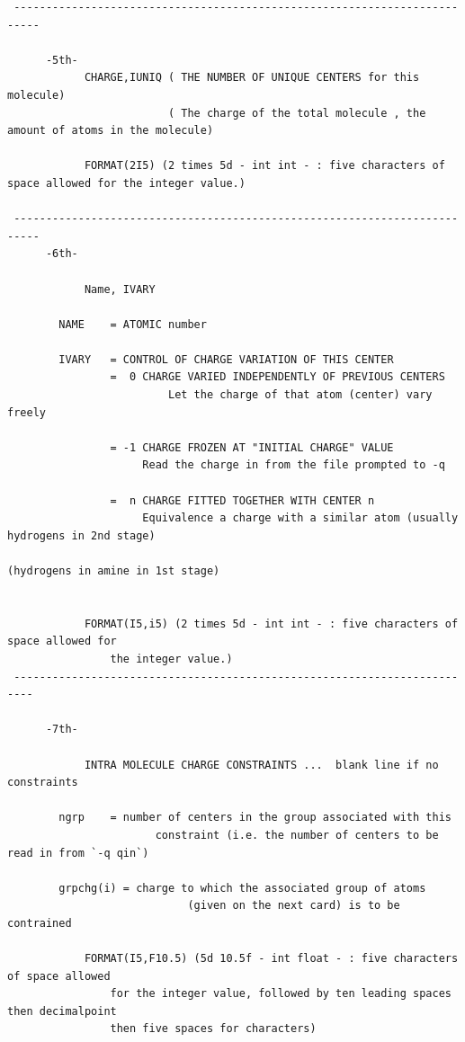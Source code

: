 \documentclass[a4paper]{article}
\begin{document}
\begin{tcolorbox}
\begin{verbatim}
 --------------------------------------------------------------------------
 
      -5th- 
            CHARGE,IUNIQ ( THE NUMBER OF UNIQUE CENTERS for this molecule)
                         ( The charge of the total molecule , the amount of atoms in the molecule)
 
            FORMAT(2I5) (2 times 5d - int int - : five characters of space allowed for the integer value.)
 
 --------------------------------------------------------------------------
      -6th-  
 
            Name, IVARY
 
        NAME    = ATOMIC number  
 
        IVARY   = CONTROL OF CHARGE VARIATION OF THIS CENTER
                =  0 CHARGE VARIED INDEPENDENTLY OF PREVIOUS CENTERS
                         Let the charge of that atom (center) vary freely
 
                = -1 CHARGE FROZEN AT "INITIAL CHARGE" VALUE
                     Read the charge in from the file prompted to -q
 
                =  n CHARGE FITTED TOGETHER WITH CENTER n
                     Equivalence a charge with a similar atom (usually hydrogens in 2nd stage)
                                                              (hydrogens in amine in 1st stage)
 
 
            FORMAT(I5,i5) (2 times 5d - int int - : five characters of space allowed for
                the integer value.) 
 -------------------------------------------------------------------------
 
      -7th-  

            INTRA MOLECULE CHARGE CONSTRAINTS ...  blank line if no constraints
        
        ngrp    = number of centers in the group associated with this
                       constraint (i.e. the number of centers to be read in from `-q qin`)
 
        grpchg(i) = charge to which the associated group of atoms
                            (given on the next card) is to be contrained
 
            FORMAT(I5,F10.5) (5d 10.5f - int float - : five characters of space allowed
                for the integer value, followed by ten leading spaces then decimalpoint
                then five spaces for characters)
 

\end{verbatim}
\end{tcolorbox}
\end{document}
